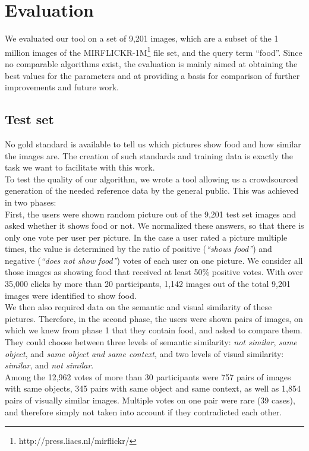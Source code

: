 %
\section{Evaluation}
\label{sec_evaluation}

We evaluated our tool on a set of 9,201 images, which are a subset of the 1 million images of the MIRFLICKR-1M\footnote{http://press.liacs.nl/mirflickr/} file set, and the query term ``food''. Since no comparable algorithms exist, the evaluation is mainly aimed at obtaining the best values for the parameters and at providing a basis for comparison of further improvements and future work.

\subsection{Test set}
\label{sec_testset}
No gold standard is available to tell us which pictures show food and how similar the images are. The creation of such standards and training data is exactly the task we want to facilitate with this work.\\ 
To test the quality of our algorithm, we wrote a tool allowing us a crowdsourced generation of the needed reference data by the general public. This was achieved in two phases:\\

First, the users were shown random picture out of the 9,201 test set images and asked whether it shows food or not. We normalized these answers, so that there is only one vote per user per picture. In the case a user rated a picture multiple times, the value is determined by the ratio of positive (\emph{``shows food''}) and negative (\emph{``does not show food''}) votes of each user on one picture. We consider all those images as showing food that received at least 50\% positive votes. With over 35,000 clicks by more than 20 participants, 1,142 images out of the total 9,201 images were identified to show food. \\

We then also required data on the semantic and visual similarity of these pictures. Therefore, in the second phase, the users were shown pairs of images, on which we knew from phase 1 that they contain food, and asked to compare them. They could choose between three levels of semantic similarity: \emph{not similar}, \emph{same object}, and \emph{same object and same context}, and two levels of visual similarity: \emph{similar}, and \emph{not similar}.\\
Among the 12,962 votes of more than 30 participants were 757 pairs of images with same objects, 345 pairs with same object and same context, as well as 1,854 pairs of visually similar images. Multiple votes on one pair were rare (39 cases), and therefore simply not taken into account if they contradicted each other.

